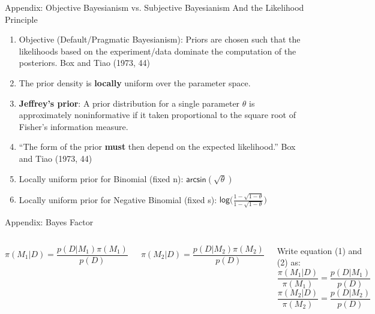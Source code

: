 \documentclass{beamer}
\begin{document}
\begin{frame}{Appendix: Objective Bayesianism vs. Subjective Bayesianism
And the Likelihood Principle}
 
 \begin{enumerate}
 \item Objective (Default/Pragmatic Bayesianism): Priors are chosen such that the likelihoods based on the experiment/data dominate the computation of the posteriors. Box and Tiao (1973, 44)
 \item The prior density is \textbf{locally} uniform over the parameter space.
   \item \textbf{Jeffrey's prior}: A prior distribution for a single parameter $\theta$ is approximately noninformative if it taken proportional to the square root of Fisher's information measure.
   \item ``The form of the prior \textbf{must} then depend on the expected likelihood.'' Box and Tiao (1973, 44)
   \item Locally uniform prior for Binomial (fixed n): $\textsf{arcsin}(\sqrt{\theta})$
   \item Locally uniform prior for Negative Binomial (fixed s): $\textsf{log}\big(\frac{1 - \sqrt{1 - \theta}}{1 - \sqrt{1 - \theta}}\big)$
 \end{enumerate}
 
\end{frame}

\begin{frame}{Appendix: Bayes Factor}
        \begin{columns}[t, onlytextwidth]
                \begin{equation}
\pi(M_{1} | D) = \frac{p(D | M_{1}) \pi(M_{1})}{p(D)}
\end{equation}

\begin{equation}
\pi(M_{2} | D) = \frac{p(D | M_{2}) \pi(M_{2})}{p(D)} 
\end{equation}
            
Write equation (1) and (2) as:
\begin{equation}
\frac{\pi(M_{1} | D)}{\pi(M_{1})} = \frac{p(D | M_{1})}{p(D)}
\end{equation}
\begin{equation}
\frac{\pi(M_{2} | D)}{\pi(M_{2})} = \frac{p(D | M_{2})}{p(D)}
\end{equation}
\end{columns}
\end{frame}
\end{document}

